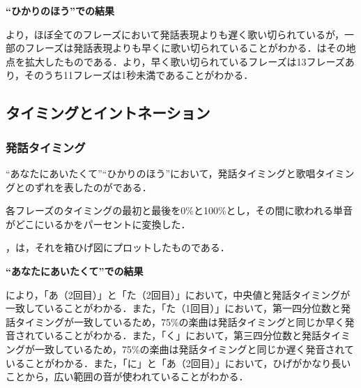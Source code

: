 \textbf{“ひかりのほう”での結果}\par
{}より，ほぼ全てのフレーズにおいて発話表現よりも遅く歌い切られているが，一部のフレーズは発話表現よりも早くに歌い切られていることがわかる．はその地点を拡大したものである．より，早く歌い切られているフレーズは13フレーズあり，そのうち11フレーズは1秒未満であることがわかる．






\subsection{タイミングとイントネーション}
\subsubsection{発話タイミング}\label{sec:4.3.1}
“あなたにあいたくて”“ひかりのほう”において，発話タイミングと歌唱タイミングとのずれを表したのがである．\par
各フレーズのタイミングの最初と最後を0\%と100\%とし，その間に歌われる単音がどこにいるかをパーセントに変換した．\par
{}，は，それを箱ひげ図にプロットしたものである．\par


\textbf{“あなたにあいたくて”での結果}\par
{}により，「あ（2回目）」と「た（2回目）」において，中央値と発話タイミングが一致していることがわかる．また，「た（1回目）」において，第一四分位数と発話タイミングが一致しているため，75\%の楽曲は発話タイミングと同じか早く発音されていることがわかる．また，「く」において，第三四分位数と発話タイミングが一致しているため，75\%の楽曲は発話タイミングと同じか遅く発音されていることがわかる．また，「に」と「あ（2回目）」において，ひげがかなり長いことから，広い範囲の音が使われていることがわかる．

